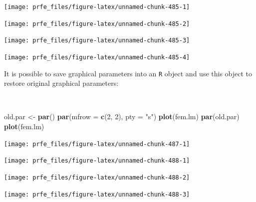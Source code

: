 \documentclass[12pt,a4paper]{book}
\newenvironment{Shaded}{\begin{snugshade}}{\end{snugshade}}
\newcommand{\KeywordTok}[1]{\textcolor[rgb]{0.13,0.29,0.53}{\textbf{#1}}}
\newcommand{\DataTypeTok}[1]{\textcolor[rgb]{0.13,0.29,0.53}{#1}}
\newcommand{\DecValTok}[1]{\textcolor[rgb]{0.00,0.00,0.81}{#1}}
\newcommand{\StringTok}[1]{\textcolor[rgb]{0.31,0.60,0.02}{#1}}
\newcommand{\NormalTok}[1]{#1}
\theoremstyle{definition}
\theoremstyle{definition}
\theoremstyle{definition}
\theoremstyle{remark}
\begin{document}
\newpage

\begin{center}\texttt{[image: prfe\_files/figure-latex/unnamed-chunk-485-1]} \end{center}

\begin{center}\texttt{[image: prfe\_files/figure-latex/unnamed-chunk-485-2]} \end{center}

\begin{center}\texttt{[image: prfe\_files/figure-latex/unnamed-chunk-485-3]} \end{center}

\begin{center}\texttt{[image: prfe\_files/figure-latex/unnamed-chunk-485-4]} \end{center}

\newpage 

It is possible to save graphical parameters into an \texttt{R} object
and use this object to restore original graphical parameters:

~

\begin{Shaded}
\begin{Highlighting}[]
\NormalTok{old.par <-}\StringTok{ }\KeywordTok{par}\NormalTok{()}
\KeywordTok{par}\NormalTok{(}\DataTypeTok{mfrow =} \KeywordTok{c}\NormalTok{(}\DecValTok{2}\NormalTok{, }\DecValTok{2}\NormalTok{), }\DataTypeTok{pty =} \StringTok{"s"}\NormalTok{)}
\KeywordTok{plot}\NormalTok{(fem.lm)}
\KeywordTok{par}\NormalTok{(old.par)}
\KeywordTok{plot}\NormalTok{(fem.lm)}
\end{Highlighting}
\end{Shaded}

\begin{center}\texttt{[image: prfe\_files/figure-latex/unnamed-chunk-487-1]} \end{center}

\newpage

\begin{center}\texttt{[image: prfe\_files/figure-latex/unnamed-chunk-488-1]} \end{center}

\begin{center}\texttt{[image: prfe\_files/figure-latex/unnamed-chunk-488-2]} \end{center}

\begin{center}\texttt{[image: prfe\_files/figure-latex/unnamed-chunk-488-3]} \end{center}
\end{document}
